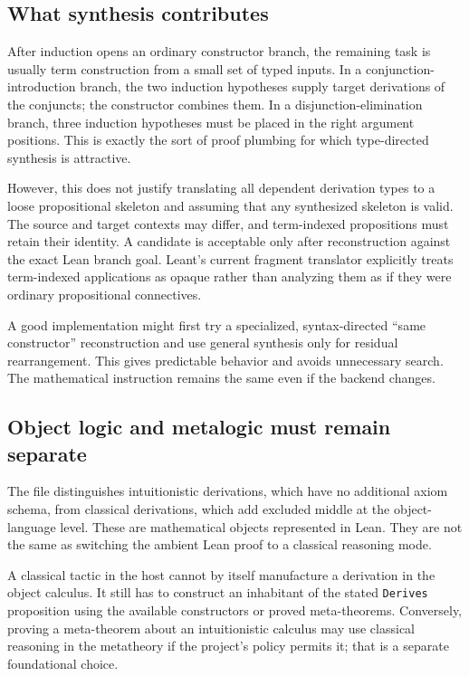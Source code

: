 \documentclass[11pt,a4paper]{article}
\theoremstyle{remark}
\newcommand{\ty}[1]{\texttt{#1}}
\begin{document}
\subsection{What synthesis contributes}
After induction opens an ordinary constructor branch, the remaining task is usually term construction from a small set of typed inputs. In a conjunction-introduction branch, the two induction hypotheses supply target derivations of the conjuncts; the constructor combines them. In a disjunction-elimination branch, three induction hypotheses must be placed in the right argument positions. This is exactly the sort of proof plumbing for which type-directed synthesis is attractive.

However, this does not justify translating all dependent derivation types to a loose propositional skeleton and assuming that any synthesized skeleton is valid. The source and target contexts may differ, and term-indexed propositions must retain their identity. A candidate is acceptable only after reconstruction against the exact Lean branch goal. Leant's current fragment translator explicitly treats term-indexed applications as opaque rather than analyzing them as if they were ordinary propositional connectives.\cite{leant-fragment}

A good implementation might first try a specialized, syntax-directed ``same constructor'' reconstruction and use general synthesis only for residual rearrangement. This gives predictable behavior and avoids unnecessary search. The mathematical instruction remains the same even if the backend changes.

\subsection{Object logic and metalogic must remain separate}
The file distinguishes intuitionistic derivations, which have no additional axiom schema, from classical derivations, which add excluded middle at the object-language level.\cite{proveit-nd} These are mathematical objects represented in Lean. They are not the same as switching the ambient Lean proof to a classical reasoning mode.

A classical tactic in the host cannot by itself manufacture a derivation in the object calculus. It still has to construct an inhabitant of the stated \ty{Derives} proposition using the available constructors or proved meta-theorems. Conversely, proving a meta-theorem about an intuitionistic calculus may use classical reasoning in the metatheory if the project's policy permits it; that is a separate foundational choice.
\end{document}
